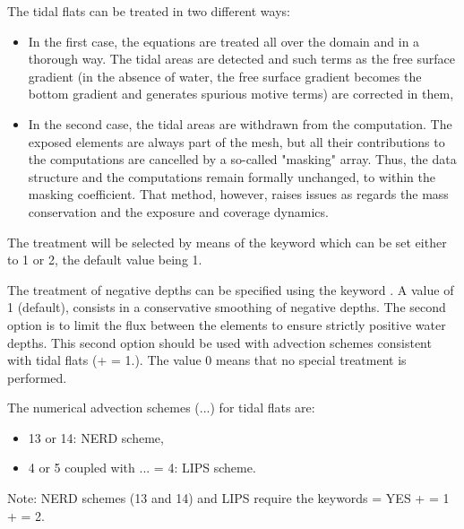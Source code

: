 The tidal flats can be treated in two different ways:

\begin{itemize}
\item In the first case, the equations are treated all over the domain and in
a thorough way. The tidal areas are detected and such terms as the free surface
gradient (in the absence of water, the free surface gradient becomes the bottom
gradient and generates spurious motive terms) are corrected in them,

\item In the second case, the tidal areas are withdrawn from the computation.
The exposed elements are always part of the mesh, but all their contributions
to the computations are cancelled by a so-called "masking" array. Thus, the
data structure and the computations remain formally unchanged, to within the
masking coefficient. That method, however, raises issues as regards the mass
conservation and the exposure and coverage dynamics.
\end{itemize}

The treatment will be selected by means of the keyword  which can be set either to 1 or 2, the default value
being 1.

The treatment of negative depths can be specified using the keyword
. A value of 1 (default), consists in a
conservative smoothing of negative depths. The second option is to limit the
flux between the elements to ensure strictly positive water depths. This second
option should be used with advection schemes consistent with tidal flats (+
 = 1.). The value 0 means that no special
treatment is performed.

The numerical advection schemes (...) for tidal
flats are:
\begin{itemize}
\item 13 or 14: NERD scheme,
\item 4 or 5 coupled with ... = 4:
LIPS scheme.
\end{itemize}

\begin{WarningBlock}{Note:}
NERD schemes (13 and 14) and LIPS require the keywords
   = YES
+  = 1
+  = 2.
\end{WarningBlock}

